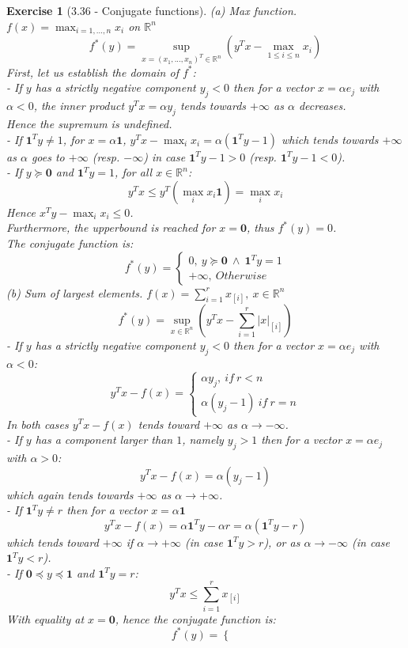 \documentclass[11pt]{article}
\theoremstyle{exo}
\newtheorem*{exercise}{Exercise}
\newcommand{\R}{\mathbb{R}}
\newcommand{\1}{\mathbf{1}}
\newcommand{\0}{\mathbf{0}}
\begin{document}
\begin{exercise}[3.36 - Conjugate functions]
(a) Max function. $f(x)=\max_{i=1,...,n}x_i$ on $\R^n$
\[f^*(y)=\sup_{x=(x_1,...,x_n)^T\in\R^n}(y^Tx-\max_{1\leq i\leq n}x_i)\]
First, let us establish the domain of $f^*$:\\
- If $y$ has a strictly negative component $y_j<0$ then for a vector $x=\alpha e_j$ with $\alpha<0$, the inner product $y^Tx=\alpha y_j$ tends towards $+\infty$ as $\alpha$ decreases.\\
Hence the supremum is undefined.\\
- If $\1^Ty\neq1$, for $x=\alpha\1$, $y^Tx-\max_ix_i=\alpha(\1^Ty-1)$ which tends towards $+\infty$ as $\alpha$ goes to $+\infty$ (resp. $-\infty$) in case $\1^Ty-1>0$ (resp. $\1^Ty-1<0$).\\
- If $y\succeq \0$ and $\1^Ty=1$, for all $x\in\R^n$:
\[y^Tx\leq y^T(\max_ix_i\1)=\max_ix_i\]
Hence $x^Ty-\max_ix_i\leq 0$.\\
Furthermore, the upperbound is reached for $x=\0$, thus $f^*(y)=0$.\\
The conjugate function is:
\[f^*(y)=
\begin{cases}
0,\:y\succeq \0\: \wedge\:\1^Ty=1\\
+\infty,\:Otherwise
\end{cases}\]
(b) Sum of largest elements. $f(x)=\sum\limits_{i=1}^rx_{[i]},\:x\in\R^n$
\[f^*(y)=\sup_{x\in\R^n}(y^Tx-\sum\limits_{i=1}^r|x|_{[i]})\]
- If $y$ has a strictly negative component $y_j<0$ then for a vector $x=\alpha e_j$ with $\alpha<0$:
\[y^Tx-f(x)=\begin{cases}
\alpha y_j,\: if\: r<n\\
\alpha(y_j-1)\:if\: r=n
\end{cases}\]
In both cases $y^Tx-f(x)$ tends toward $+\infty$ as $\alpha\to -\infty$.\\
- If $y$ has a component larger than $1$, namely $y_j>1$ then for a vector $x=\alpha e_j$ with $\alpha>0$:
\[y^Tx-f(x)=\alpha(y_j-1)\]
which again tends towards $+\infty$ as $\alpha\to+\infty$.\\
- If $\1^Ty\neq r$ then for a vector $x=\alpha\1$
\[y^Tx-f(x)=\alpha\1^Ty-\alpha r=\alpha(\1^Ty-r)\]
which tends toward $+\infty$ if $\alpha\to+\infty$ (in case $\1^Ty>r$), or as $\alpha\to-\infty$ (in case $\1^Ty<r$).\\
- If $\0\preceq y\preceq \1$ and $\1^Ty=r$:
\[y^Tx\leq\sum\limits_{i=1}^rx_{[i]}\]
With equality at $x=\0$, hence the conjugate function is:
\[f^*(y)=
\begin{cases}

\end{cases}\]
\end{exercise}
\end{document}
